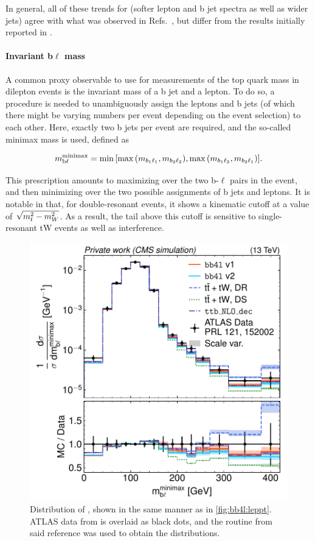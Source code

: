 In general, all of these trends for \bbfourl (softer lepton and b jet spectra as well as wider jets) agree with what was observed in Refs.~\cite{FerrarioRavasio:2018whr,ATLAS:PHYS-PUB-2021-042}, but differ from the results initially reported in .

\paragraph{Invariant b$\ell$ mass} A common proxy observable to use for measurements of the top quark mass in dilepton events is the invariant mass \mbl of a b jet and a lepton. To do so, a procedure is needed to unambiguously assign the leptons and b jets (of which there might be varying numbers per event depending on the event selection) to each other. Here, exactly two b jets per event are required, and the so-called minimax mass is used, defined as

\begin{equation}
    m_{\mathrm{b \ell}}^{\mathrm{minimax}} = \min{ \left[  \max{ \left( m_{b_1 \ell_1},
          m_{b_2 \ell_2} \right) }, \max{ \left( m_{b_1 \ell_2},
          m_{b_2 \ell_1} \right) } \right] }.
\end{equation}

This prescription amounts to maximizing over the two b-$\ell$ pairs in the event, and then minimizing over the two possible assignments of b jets and leptons. It is notable in that, for double-resonant \ttbar events, it shows a kinematic cutoff at a value of $\sqrt{\smash[b]{m_t^2 - m_W^2}}$. As a result, the tail above this cutoff is sensitive to single-resonant tW events as well as \tttW interference.

\begin{figure}[tp]
    \centering
    \includegraphics[width=0.49 \textwidth]{figures/bb4l/generators/ATLAS_2018_I1677498_d03-x01-y01.pdf}
    \caption{Distribution of \mblminimax, shown in the same manner as in \cref{fig:bb4l:leppt}. ATLAS data from  is overlaid as black dots, and the \rivet routine from said reference was used to obtain the distributions.}
    \label{fig:bb4l:mbl}
\end{figure}

